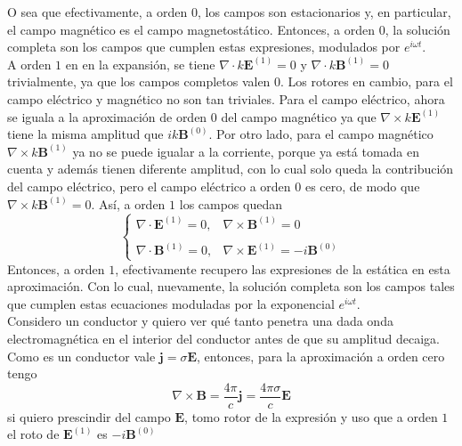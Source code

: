 \indent O sea que efectivamente, a orden 0, los campos son estacionarios y, en particular, el campo magnético es el campo magnetostático. Entonces, a orden $0$, la solución completa son los campos que cumplen estas expresiones, modulados por $e^{i\omega t}$.\\
\indent A orden $1$ en en la expansión, se tiene $\nabla \cdot k\textbf{E}^{(1)} = 0$ y $\nabla \cdot k\textbf{B}^{(1)} = 0$ trivialmente, ya que los campos completos valen $0$. Los rotores en cambio, para el campo eléctrico y magnético no son tan triviales. Para el campo eléctrico, ahora se iguala a la aproximación de orden $0$ del campo magnético ya que $\nabla \times k\textbf{E}^{(1)}$ tiene la misma amplitud que $ik\textbf{B}^{(0)}$. Por otro lado, para el campo magnético $\nabla \times k\textbf{B}^{(1)}$ ya no se puede igualar a la corriente, porque ya está tomada en cuenta y además tienen diferente amplitud, con lo cual solo queda la contribución del campo eléctrico, pero el campo eléctrico a orden $0$ es cero, de modo que $\nabla \times k \textbf{B}^{(1)} = 0$. Así, a orden $1$ los campos quedan
\begin{equation*}
    \left\{
        \begin{matrix}
            \nabla \cdot \textbf{E}^{(1)} = 0,
            &
            \nabla \times \textbf{B}^{(1)} = 0\\
            & \\
            \nabla \cdot \textbf{B}^{(1)} = 0,
            &
            \nabla \times \textbf{E}^{(1)} = -i \textbf{B}^{(0)}
        \end{matrix}
    \right.
\end{equation*}
Entonces, a orden $1$, efectivamente recupero las expresiones de la estática en esta aproximación. Con lo cual, nuevamente, la solución completa son los campos tales que cumplen estas ecuaciones moduladas por la exponencial $e^{i\omega t}$.\\
\indent Considero un conductor y quiero ver qué tanto penetra una dada onda electromagnética en el interior del conductor antes de que su amplitud decaiga. Como es un conductor vale $\textbf{j} = \sigma \textbf{E}$, entonces, para la aproximación a orden cero tengo
\begin{equation*}
    \nabla \times \textbf{B}
    = \frac{4\pi}{c}\textbf{j} 
    = \frac{4\pi \sigma}{c}\textbf{E}
\end{equation*}
si quiero prescindir del campo $\textbf{E}$, tomo rotor de la expresión y uso que a orden $1$ el roto de $\textbf{E}^{(1)}$ es $-i\textbf{B}^{(0)}$
